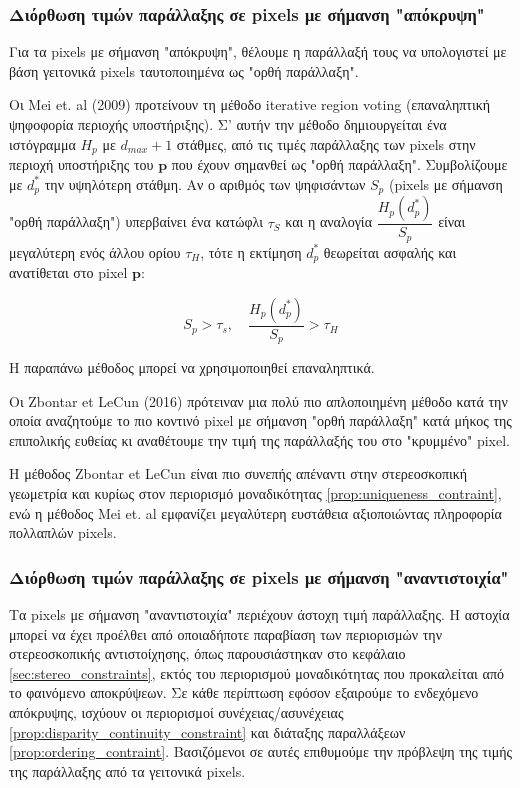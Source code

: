 \subsubsection{Διόρθωση τιμών παράλλαξης σε \texorpdfstring{\e pixels \g}{TEXT} με σήμανση "απόκρυψη"}
Για τα \e pixels \g με σήμανση "απόκρυψη", θέλουμε η παράλλαξή τους να υπολογιστεί με βάση γειτονικά \e pixels \g ταυτοποιημένα ως "ορθή παράλλαξη".

Οι \e Mei et. al (2009) \g \citep{mei2011building} προτείνουν τη μέθοδο \e iterative region voting \g (επαναληπτική ψηφοφορία περιοχής υποστήριξης). Σ' αυτήν την μέθοδο δημιουργείται ένα ιστόγραμμα $H_p$ με \e $ d_{max} + 1 $ \g στάθμες, από τις τιμές παράλλαξης των \e pixels \g στην περιοχή υποστήριξης του \e $\textbf{p}$ \g που έχουν σημανθεί ως "ορθή παράλλαξη". Συμβολίζουμε με $d_p^{\ast}$ την υψηλότερη στάθμη. Αν ο αριθμός των ψηφισάντων $S_p$ \e (pixels \g με σήμανση "ορθή παράλλαξη") υπερβαίνει ένα κατώφλι $\tau_S$ και η αναλογία $\dfrac{H_p(d_p^{\ast})}{S_p}$ είναι μεγαλύτερη ενός άλλου ορίου $\tau_H$, τότε η εκτίμηση $d_p^{\ast}$ θεωρείται ασφαλής και ανατίθεται στο \e pixel $\textbf{p}$: \g 

$$ S_p > \tau_s, \quad \dfrac{H_p(d_p^{\ast})}{S_p}>\tau_H$$

Η παραπάνω μέθοδος μπορεί να χρησιμοποιηθεί επαναληπτικά.

Οι \e Zbontar et LeCun (2016) \g \citep{zbontar2016stereo} πρότειναν μια πολύ πιο απλοποιημένη μέθοδο κατά την οποία αναζητούμε το πιο κοντινό \e pixel \g με σήμανση "ορθή παράλλαξη" κατά μήκος της επιπολικής ευθείας κι αναθέτουμε την τιμή της παράλλαξής του στο "κρυμμένο" \e pixel. \g

Η μέθοδος \e Zbontar et LeCun \g είναι πιο συνεπής απέναντι στην στερεοσκοπική γεωμετρία και κυρίως στον περιορισμό μοναδικότητας \ref{prop:uniqueness_contraint}, ενώ η μέθοδος \e Mei et. al \g εμφανίζει μεγαλύτερη ευστάθεια αξιοποιώντας πληροφορία πολλαπλών \e pixels. \g

\subsubsection{Διόρθωση τιμών παράλλαξης σε \texorpdfstring{\e pixels \g}{TEXT} με σήμανση "αναντιστοιχία"}

Τα \e pixels \g με σήμανση "αναντιστοιχία" περιέχουν άστοχη τιμή παράλλαξης. Η αστοχία μπορεί να έχει προέλθει από οποιαδήποτε παραβίαση των περιορισμών την στερεοσκοπικής αντιστοίχησης, όπως παρουσιάστηκαν στο κεφάλαιο \ref{sec:stereo_constraints}, εκτός του περιορισμού μοναδικότητας που προκαλείται από το φαινόμενο αποκρύψεων. Σε κάθε περίπτωση εφόσον εξαιρούμε το ενδεχόμενο απόκρυψης, ισχύουν οι περιορισμοί συνέχειας/ασυνέχειας \ref{prop:disparity_continuity_constraint} και διάταξης παραλλάξεων \ref{prop:ordering_contraint}. Βασιζόμενοι σε αυτές επιθυμούμε την πρόβλεψη της τιμής της παράλλαξης από τα γειτονικά \e pixels. \g

